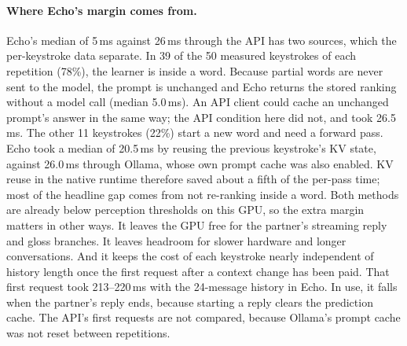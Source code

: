 \documentclass[11pt,a4paper]{article}
\begin{document}
\paragraph{Where Echo's margin comes from.} Echo's median of 5\,ms against 26\,ms through the API has two sources, which the per-keystroke data separate. In 39 of the 50 measured keystrokes of each repetition (78\%), the learner is inside a word. Because partial words are never sent to the model, the prompt is unchanged and Echo returns the stored ranking without a model call (median 5.0\,ms). An API client could cache an unchanged prompt's answer in the same way; the API condition here did not, and took 26.5\,ms. The other 11 keystrokes (22\%) start a new word and need a forward pass. Echo took a median of 20.5\,ms by reusing the previous keystroke's KV state, against 26.0\,ms through Ollama, whose own prompt cache was also enabled. KV reuse in the native runtime therefore saved about a fifth of the per-pass time; most of the headline gap comes from not re-ranking inside a word. Both methods are already below perception thresholds on this GPU, so the extra margin matters in other ways. It leaves the GPU free for the partner's streaming reply and gloss branches. It leaves headroom for slower hardware and longer conversations. And it keeps the cost of each keystroke nearly independent of history length once the first request after a context change has been paid. That first request took 213--220\,ms with the 24-message history in Echo. In use, it falls when the partner's reply ends, because starting a reply clears the prediction cache. The API's first requests are not compared, because Ollama's prompt cache was not reset between repetitions.
\end{document}
